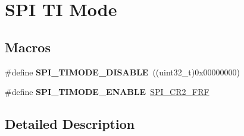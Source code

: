 \hypertarget{group___s_p_i___t_i__mode}{}\section{S\+PI TI Mode}
\label{group___s_p_i___t_i__mode}
\subsection*{Macros}
\begin{DoxyCompactItemize}
\item 
\#define {\bfseries S\+P\+I\+\_\+\+T\+I\+M\+O\+D\+E\+\_\+\+D\+I\+S\+A\+B\+LE}~((uint32\+\_\+t)0x00000000)\hypertarget{group___s_p_i___t_i__mode_gaffbf066ee656a4d56b75fa721a2eabcd}{}\label{group___s_p_i___t_i__mode_gaffbf066ee656a4d56b75fa721a2eabcd}

\item 
\#define {\bfseries S\+P\+I\+\_\+\+T\+I\+M\+O\+D\+E\+\_\+\+E\+N\+A\+B\+LE}~\hyperlink{group___peripheral___registers___bits___definition_ga09e3f41fa2150831afaac191046087f2}{S\+P\+I\+\_\+\+C\+R2\+\_\+\+F\+RF}\hypertarget{group___s_p_i___t_i__mode_ga8b31d4b25f951edd1dfd7cf6d4387517}{}\label{group___s_p_i___t_i__mode_ga8b31d4b25f951edd1dfd7cf6d4387517}

\end{DoxyCompactItemize}


\subsection{Detailed Description}
